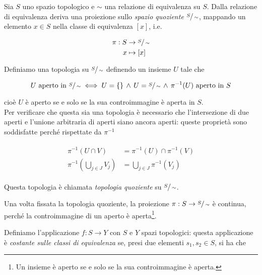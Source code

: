 Sia $ S $ uno spazio topologico e $ \sim $ una relazione di equivalenza su $ S $. Dalla relazione di equivalenza deriva una proiezione sullo \textit{spazio quoziente} $ \sfrac{S}{\sim} $, mappando un elemento $ x \in S $ nella classe di equivalenza $ [x] $, i.e.

\begin{align}
	\begin{split}
		\pi : S &\to \sfrac{S}{\sim}\\
		x &\mapsto [x]
	\end{split}
\end{align}

Definiamo una topologia su $ \sfrac{S}{\sim} $ definendo un insieme $ U $ tale che

\begin{equation}
	U \text{ aperto in } \sfrac{S}{\sim} \iff U = \{\} \, \wedge \, U = \sfrac{S}{\sim} \, \wedge \, \pi^{-1}(U) \text{ aperto in } S
\end{equation}

cioè $ U $ è aperto se e solo se la sua controimmagine è aperta in $ S $.\\
Per verificare che questa sia una topologia è necessario che l'intersezione di due aperti e l'unione arbitraria di aperti siano ancora aperti: queste proprietà sono soddisfatte perché rispettate da $ \pi^{-1} $

\begin{align}
	\begin{split}
		\pi^{-1}(U \cap V) &= \pi^{-1}(U) \cap \pi^{-1}(V)\\
		\pi^{-1}\left( \bigcup_{j \in J} V_{j} \right) &= \bigcup_{j \in J} \pi^{-1}(V_{j})
	\end{split}
\end{align}

Questa topologia è chiamata \textit{topologia quoziente} su $ \sfrac{S}{\sim} $.

\begin{remark}
	Una volta fissata la topologia quoziente, la proiezione $ \pi : S \to \sfrac{S}{\sim} $ è continua, perché la controimmagine di un aperto è aperta\footnote{%
		Un insieme è aperto se e solo se la sua controimmagine è aperta.%
	}.
\end{remark}

Definiamo l'applicazione $ f : S \to Y $ con $ S $ e $ Y $ spazi topologici: questa applicazione è \textit{costante sulle classi di equivalenza} se, presi due elementi $ s_{1},s_{2} \in S $, si ha che

